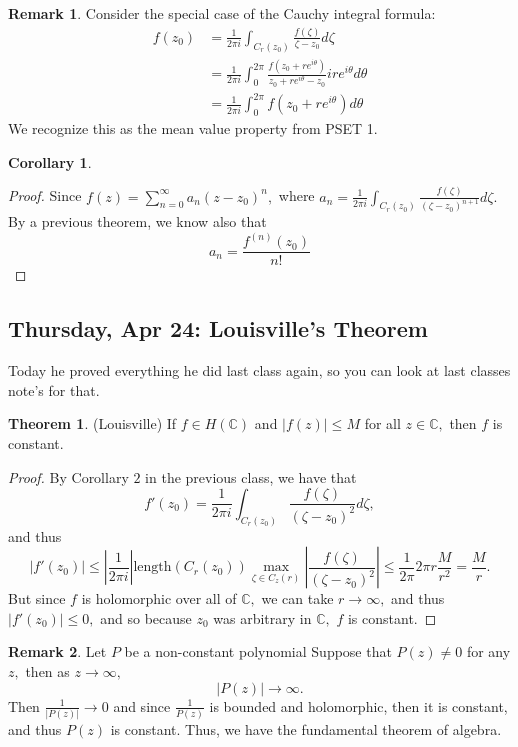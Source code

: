 \documentclass[10pt, oneside]{article}
\newcommand{\bbC}{\mathbb{C}}
\theoremstyle{definition}
\newtheorem{thm}{Theorem}
\newtheorem{rem}{Remark}
\newtheorem{cor}{Corollary}
\begin{document}
\begin{rem}
    Consider the special case of the Cauchy integral formula:
    \begin{align*}
    f(z_0) &= \frac{1}{2\pi i}\int_{C_r(z_0)} \frac{f(\zeta)}{\zeta - z_0}d\zeta\\
    &= \frac{1}{2\pi i} \int_0^{2\pi} \frac{f(z_0 + re^{i\theta})}{z_0 + re^{i\theta} - z_0}ir e^{i \theta}d\theta\\
    &= \frac{1}{2\pi i} \int_0^{2\pi} f(z_0 + re^{i\theta})d\theta
    \end{align*}
    We recognize this as the mean value property from PSET 1.
\end{rem}

\begin{cor}
    
\end{cor}
\begin{proof}
    Since $f(z) = \sum_{n=0}^\infty a_n(z - z_0)^n,$ where $a_n = \frac{1}{2\pi i} \int_{C_r(z_0)} \frac{f(\zeta)}{(\zeta - z_0)^{n+1}}d\zeta.$ By a previous theorem, we know also that 
    \[a_n = \frac{f^{(n)}(z_0)}{n!}\]
\end{proof}

\newpage
\subsection{Thursday, Apr 24: Louisville's Theorem}

Today he proved everything he did last class again, so you can look at last classes note's for that. 
\begin{thm}
    (Louisville) If $f \in H(\bbC)$ and $|f(z)| \leq M$ for all $z\in \bbC,$ then $f$ is constant.
\end{thm}
\begin{proof}
By Corollary $2$ in the previous class, we have that 
\[f'(z_0) = \frac{1}{2\pi i} \int_{C_r(z_0)}\frac{f(\zeta)}{(\zeta - z_0)^2}d\zeta,\] and thus 
\[|f'(z_0)| \leq  |\frac{1}{2\pi i}|\text{length}(C_r(z_0)) \max_{\zeta \in C_z(r)} \left|\frac{f(\zeta)}{(\zeta - z_0)^2}\right| \leq \frac{1}{2\pi }2\pi r  \frac{M}{r^2} = \frac{M}{r }.\] But since $f$ is holomorphic over all of $\bbC,$ we can take $r \to \infty,$ and thus $|f'(z_0)| \leq 0,$ and so because $z_0$ was arbitrary in $\bbC,$ $f$ is constant.
\end{proof}

\begin{rem}
    Let $P$ be a non-constant polynomial Suppose that $P(z) \neq 0$ for any $z,$ then as $z\to \infty,$ 
    \[|P(z)| \to \infty.\] Then $\frac{1}{|P(z)|} \to 0$ and since $\frac{1}{P(z)}$ is bounded and holomorphic, then it is constant, and thus $P(z)$ is constant. Thus, we have the fundamental theorem of algebra.
\end{rem}
\end{document}
